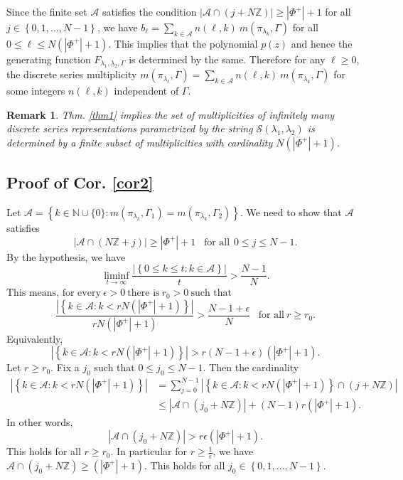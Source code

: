 \documentclass[11 pt]{amsart}
\newcommand{\Z}{{\mathbb Z}}
\newcommand{\N}{{\mathbb N}}
\theoremstyle{definition}
\newtheorem{remark}{Remark}[section]
\numberwithin{equation}{section}
\begin{document}
\vspace{5pt}

\noindent Since the finite set $\mathcal{A}$ satisfies the condition $|\mathcal{A} \cap (j+N \Z)| \geq |\Phi^+|+1$ for all $j \in \left\{ 0,1, \dots ,N-1 \right\}$, we have  $ b_{\ell} = \sum\limits_{k \in \mathcal{A}} n(\ell, k)\  m(\pi_{\lambda_k},\Gamma)$ for all $0 \leq \ell \leq N(|\Phi^+|+1)$. This implies that the polynomial $p(z)$ and hence the generating function $F_{\lambda_1, \lambda_2, \Gamma}$ is determined by the same. Therefore for any $\ell \geq 0$, the discrete series multiplicity $m(\pi_{\lambda_{\ell}},\Gamma)=\sum\limits_{k \in \mathcal{A}} n(\ell, k)\ m(\pi_{\lambda_k},\Gamma)$ for some integers $n(\ell, k)$ independent of $\Gamma$. 

\begin{remark}
\textit{Thm. \ref{thm1} implies the set of multiplicities of infinitely many discrete series representations parametrized by the string $\mathcal{S}(\lambda_1 , \lambda_2)$ is determined by a finite subset of multiplicities with cardinality $N (|\Phi^+| +1) $. } 
\end{remark}


\subsection{Proof of Cor. \ref{cor2}}\label{proofcor2}
 
Let $\mathcal{A}= \left\{k \in \N \cup \{0\} : m(\pi_{\lambda_k},\Gamma_1)=m(\pi_{\lambda_k},\Gamma_2) \right\}$. We need to show that $\mathcal{A}$ satisfies 
$$|\mathcal{A} \cap (N \Z +j)| \geq |\Phi^+|+1 \hspace{10pt} \text{for all} \hspace{5pt} 0 \leq j \leq N-1.$$
By the hypothesis, we have $$ \liminf\limits_{t \rightarrow \infty} \frac{| \left\{ 0 \leq k \leq t : k \in \mathcal{A} \right\}|}{t} > \frac{N-1}{N}.$$
$ \text{This means, for every}~\epsilon >0 ~\text{there is}~ r_0 >0~ \text{such that}~$  $$\frac{|\left\{ k \in \mathcal{A} : k<rN(|\Phi^+|+1) \right\}|}{rN(|\Phi^+|+1)} > \frac{N-1+\epsilon}{N} \hspace{10pt} \text{for all}~r \geq r_0.$$ 
Equivalently,
$$| \left\{ k \in \mathcal{A} : k<rN(|\Phi^+|+1) \right\}| > r(N-1+\epsilon) (|\Phi^+|+1).$$
Let $r \geq r_0$. Fix a $j_0$ such that $0 \leq j_0 \leq N-1$.
Then the cardinality
\begin{equation*}
\begin{split}
| \left\{ k \in \mathcal{A} : k<rN(|\Phi^+|+1) \right\}| &= \sum_{j=0}^{N-1} |\left\{ k \in \mathcal{A} : k<rN(|\Phi^+|+1) \right\} \cap (j+N \Z)|\\
&\leq |\mathcal{A} \cap (j_0 + N\Z)| + (N-1)r (|\Phi^+|+1).
\end{split}
\end{equation*}
In other words, $$|\mathcal{A} \cap (j_0 + N\Z)|  > r \epsilon (|\Phi^+|+1).$$
This holds for all $r \geq r_0$. In particular for $r \geq \frac{1}{\epsilon}$, we have $\mathcal{A} \cap (j_0+ N\Z) \geq (|\Phi^+|+1)$.
This holds for all $j_0 \in \left\{ 0,1, \dots ,N-1 \right\}$.
\end{document}
